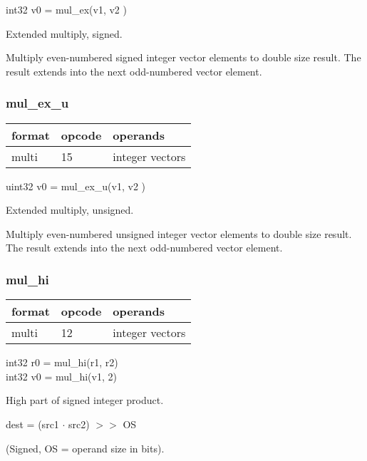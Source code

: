 \documentclass[forwardcom.tex]{subfiles}
\begin{document}
int32 v0 = mul\_ex(v1, v2 )
\vspace{2mm}

Extended multiply, signed.
\vspace{2mm}

Multiply even-numbered signed integer vector elements to double size result. The result extends into the next odd-numbered vector element.

\subsubsection{mul\_ex\_u}
\label{table:mulExUInstruction}
\begin{tabular}{|p{12mm}|p{12mm}|p{110mm}|}
\hline
\bfseries format & \bfseries opcode & \bfseries operands \\ \hline
multi & 15 & integer vectors \\ \hline
\end{tabular}
\vspace{2mm}

uint32 v0 = mul\_ex\_u(v1, v2 )
\vspace{2mm}

Extended multiply, unsigned.
\vspace{2mm}

Multiply even-numbered unsigned integer vector elements to double size result. The result extends into the next odd-numbered vector element.

\subsubsection{mul\_hi}
\label{table:mulHiInstruction}
\begin{tabular}{|p{12mm}|p{12mm}|p{110mm}|}
\hline
\bfseries format & \bfseries opcode & \bfseries operands \\ \hline
multi & 12 & integer vectors \\ \hline
\end{tabular}
\vspace{2mm}

int32 r0 = mul\_hi(r1, r2) \\
int32 v0 = mul\_hi(v1, 2)
\vspace{2mm}

High part of signed integer product.
\vspace{2mm}

dest = (src1 $\cdot$ src2) $>>$ OS

(Signed, OS = operand size in bits).
\end{document}
